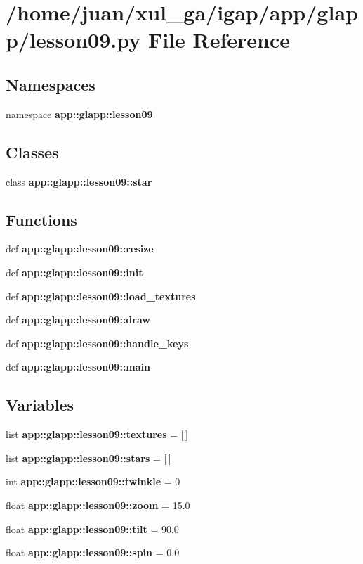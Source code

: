 \section{/home/juan/xul\_\-ga/igap/app/glapp/lesson09.py File Reference}
\label{lesson09_8py}
\subsection*{Namespaces}
\begin{CompactItemize}
\item 
namespace {\bf app::glapp::lesson09}
\end{CompactItemize}
\subsection*{Classes}
\begin{CompactItemize}
\item 
class {\bf app::glapp::lesson09::star}
\end{CompactItemize}
\subsection*{Functions}
\begin{CompactItemize}
\item 
def {\bf app::glapp::lesson09::resize}
\item 
def {\bf app::glapp::lesson09::init}
\item 
def {\bf app::glapp::lesson09::load\_\-textures}
\item 
def {\bf app::glapp::lesson09::draw}
\item 
def {\bf app::glapp::lesson09::handle\_\-keys}
\item 
def {\bf app::glapp::lesson09::main}
\end{CompactItemize}
\subsection*{Variables}
\begin{CompactItemize}
\item 
list {\bf app::glapp::lesson09::textures} = [$\,$]
\item 
list {\bf app::glapp::lesson09::stars} = [$\,$]
\item 
int {\bf app::glapp::lesson09::twinkle} = 0
\item 
float {\bf app::glapp::lesson09::zoom} = 15.0
\item 
float {\bf app::glapp::lesson09::tilt} = 90.0
\item 
float {\bf app::glapp::lesson09::spin} = 0.0
\end{CompactItemize}
